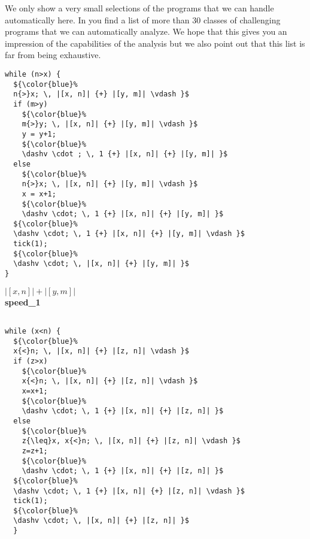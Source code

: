 \documentclass[nocopyrightspace,preprint]{sigplanconf}
\newcommand{\pref}[1]{\prettyref{#1}}
\begin{document}
We only show a very small selections of the programs that we can
handle automatically here.  In \pref{app:cat} you find a list of more
than $30$ classes of challenging programs that we can automatically
analyze.  We hope that this gives you an impression of the
capabilities of the analysis but we also point out that this list is
far from being exhaustive.

\newlength{\progwidth}

\begin{figure*}[t!]
 \setlength{\progwidth}{.22\linewidth}
  \centering
\hspace{-0.4cm}
  \begin{minipage}[b]{.18\linewidth}
    \begin{center}
   \begin{lstlisting}[]
while (n>x) {
  ${\color{blue}%
  n{>}x; \, |[x, n]| {+} |[y, m]| \vdash }$
  if (m>y) 
    ${\color{blue}%
    m{>}y; \, |[x, n]| {+} |[y, m]| \vdash }$
    y = y+1;
    ${\color{blue}%
    \dashv \cdot ; \, 1 {+} |[x, n]| {+} |[y, m]| }$
  else
    ${\color{blue}%
    n{>}x; \, |[x, n]| {+} |[y, m]| \vdash }$
    x = x+1;
    ${\color{blue}%
    \dashv \cdot; \, 1 {+} |[x, n]| {+} |[y, m]| }$
  ${\color{blue}%
  \dashv \cdot; \, 1 {+} |[x, n]| {+} |[y, m]| \vdash }$
  tick(1);
  ${\color{blue}%
  \dashv \cdot; \, |[x, n]| {+} |[y, m]| }$
}
   \end{lstlisting}

$|[x, n]| + |[y, m]|$
\\[.7\baselineskip]
      {\bf speed\_1}
    \end{center}
  \end{minipage}
%
\hfill
%
  \begin{minipage}[b]{\progwidth}
    \begin{center}
   \begin{lstlisting}

while (x<n) {
  ${\color{blue}%
  x{<}n; \, |[x, n]| {+} |[z, n]| \vdash }$
  if (z>x)
    ${\color{blue}%
    x{<}n; \, |[x, n]| {+} |[z, n]| \vdash }$
    x=x+1;
    ${\color{blue}%
    \dashv \cdot; \, 1 {+} |[x, n]| {+} |[z, n]| }$
  else
    ${\color{blue}%
    z{\leq}x, x{<}n; \, |[x, n]| {+} |[z, n]| \vdash }$
    z=z+1;
    ${\color{blue}%
    \dashv \cdot; \, 1 {+} |[x, n]| {+} |[z, n]| }$
  ${\color{blue}%
  \dashv \cdot; \, 1 {+} |[x, n]| {+} |[z, n]| \vdash }$
  tick(1);
  ${\color{blue}%
  \dashv \cdot; \, |[x, n]| {+} |[z, n]| }$
  }
   \end{lstlisting}


\end{center}
\end{minipage}
\end{figure*}
\end{document}
